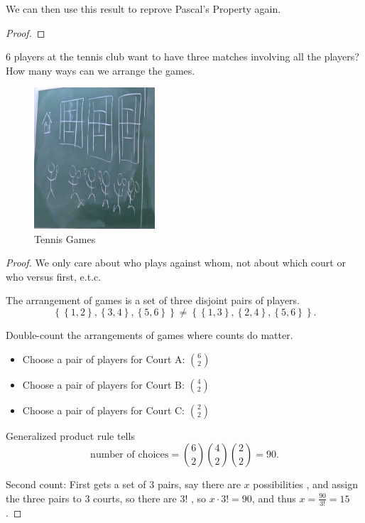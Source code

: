\begin{corollary}
    We can then use this result to reprove Pascal's Property again.
\end{corollary}
\begin{proof}
    
\end{proof}

\begin{exercise}
    \(6\) players at the tennis club want to have three matches involving all the players? How many ways can we arrange the games. 
\end{exercise}
\begin{figure}[H]
    \centering
    \includegraphics[width=0.4\textwidth]{./Figures/20250905_130141.jpg}
    \caption{Tennis Games}
    \label{fig:tennis game}
\end{figure}
\begin{proof}
    We only care about who plays against whom, not about which court or who versus first, e.t.c. 

    The arrangement of games is a set of three disjoint pairs of players. 
    \[
        \left\{ \left\{ 1,2 \right\} , \left\{ 3,4 \right\} , \left\{ 5,6 \right\}    \right\} \neq \left\{ \left\{ 1,3 \right\}, \left\{ 2,4 \right\}, \left\{ 5,6 \right\}    \right\}. 
    \]

    Double-count the arrangements of games where counts do matter. 
    \begin{itemize}
        \item Choose a pair of players for Court A: \(\binom{6}{2}\)
        \item Choose a pair of players for Court B: \(\binom{4}{2}\)
        \item Choose a pair of players for Court C: \(\binom{2}{2}\) 
    \end{itemize}

    Generalized product rule tells 
    \[
        \text{number of choices} = \binom{6}{2} \binom{4}{2} \binom{2}{2} = 90.
    \]

    Second count: First gets a set of \(3\) pairs, say there are \(x\) possibilities , and assign the three pairs to \(3\) courts, so there are \(3!\) , so \(x \cdot 3! = 90\), and thus \(x = \frac{90}{3!} =15\).  
\end{proof}
